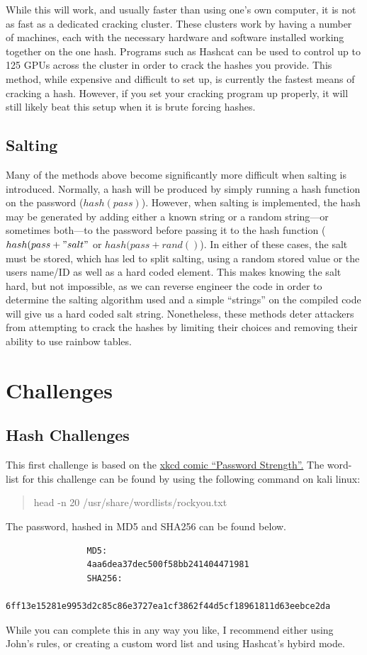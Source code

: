 \documentclass[a4paper,11pt]{report}
\begin{document}
			While this will work, and usually faster than using one's own computer, it is not as fast as a dedicated cracking cluster. 
			These clusters work by having a number of machines, each with the necessary hardware and software installed working together on the one hash. 
			Programs such as Hashcat can be used to control up to 125 GPUs across the cluster in order to crack the hashes you provide. 
			This method, while expensive and difficult to set up, is currently the fastest means of cracking a hash. 
			However, if you set your cracking program up properly, it will still likely beat this setup when it is brute forcing hashes. 
		\subsection{Salting}
			Many of the methods above become significantly more difficult when salting is introduced. 
			Normally, a hash will be produced by simply running a hash function on the password ($hash(pass)$). 
			However, when salting is implemented, the hash may be generated by adding either a known string or a random string---or sometimes both---to the password before passing it to the hash function ($hash(pass + "salt"$ or $hash(pass + rand()$).
			In either of these cases, the salt must be stored, which has led to split salting, using a random stored value or the users name/ID as well as a hard coded element. 
			This makes knowing the salt hard, but not impossible, as we can reverse engineer the code in order to determine the salting algorithm used and a simple ``strings'' on the compiled code will give us a hard coded salt string. 
			Nonetheless, these methods deter attackers from attempting to crack the hashes by limiting their choices and removing their ability to use rainbow tables. 
	\section{Challenges}
		\subsection{Hash Challenges}
			This first challenge is based on the \href{https://xkcd.com/936/}{xkcd comic ``Password Strength''.}
			The word-list for this challenge can be found by using the following command on kali linux:
			\begin{quote}
				head -n 20 /usr/share/wordlists/rockyou.txt
			\end{quote}
			The password, hashed in MD5 and SHA256 can be found below. 
			\begin{verbatim}
				MD5: 
				4aa6dea37dec500f58bb241404471981
				SHA256: 
				6ff13e15281e9953d2c85c86e3727ea1cf3862f44d5cf18961811d63eebce2da 
			\end{verbatim}
			While you can complete this in any way you like, I recommend either using John's rules, or creating a custom word list and using Hashcat's hybird mode. 
\end{document}
